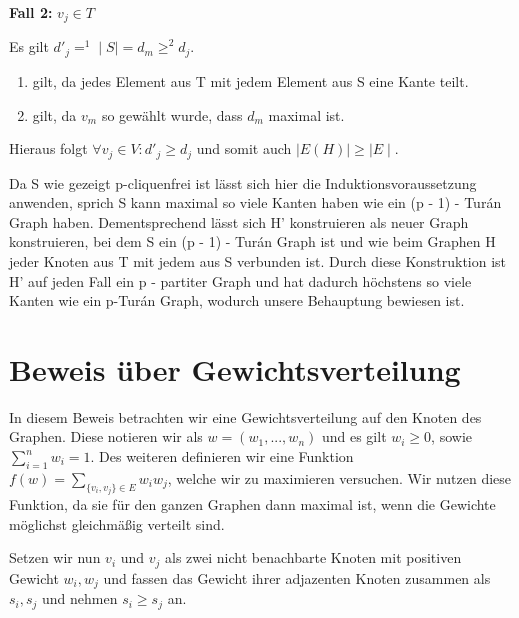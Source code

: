 \documentclass[12pt, a4paper]{article}
\begin{document}
\textbf{Fall 2:} $v_j \in T$

Es gilt $d'_j =^1 \mid S \mid = d_m \ge^2 d_j$.
\begin{enumerate}
\item {}
gilt, da jedes Element aus T mit jedem Element aus S eine Kante teilt.

\item {}
gilt, da $v_m$ so gewählt wurde, dass $d_m$ maximal ist.

\end{enumerate}

Hieraus folgt $\forall v_j \in V: d'_j \ge d_j$ und somit auch $\mid E(H) \mid \ge \mid E \mid$.

Da S wie gezeigt p-cliquenfrei ist lässt sich hier die Induktionsvoraussetzung anwenden, sprich S kann maximal so viele Kanten haben wie ein (p - 1) - Turán Graph haben. Dementsprechend lässt sich H' konstruieren als neuer Graph konstruieren, bei dem S ein (p - 1) - Turán Graph ist und wie beim Graphen H jeder Knoten aus T mit jedem aus S verbunden ist. Durch diese Konstruktion ist H' auf jeden Fall ein p - partiter Graph und hat dadurch höchstens so viele Kanten wie ein p-Turán Graph, wodurch unsere Behauptung bewiesen ist.


\section{Beweis über Gewichtsverteilung}
\label{proof/third::doc}\label{proof/third:dritter-beweis-gewichtsverteilung}
In diesem Beweis betrachten wir eine Gewichtsverteilung auf den Knoten des Graphen. Diese notieren wir als $w = (w_1,...,w_n)$ und es gilt $w_i \ge 0$, sowie $\sum^n_{i=1}w_i = 1$. Des weiteren definieren wir eine Funktion $f(w) = \sum_{ \{v_i, v_j\} \in E} w_i w_j$, welche wir zu maximieren versuchen. Wir nutzen diese Funktion, da sie für den ganzen Graphen dann maximal ist, wenn die Gewichte möglichst gleichmäßig verteilt sind.

Setzen wir nun $v_i$ und $v_j$ als zwei nicht benachbarte Knoten mit positiven Gewicht $w_i, w_j$ und fassen das Gewicht ihrer adjazenten Knoten zusammen als $s_i, s_j$ und nehmen $s_i \ge s_j$ an.
\end{document}
